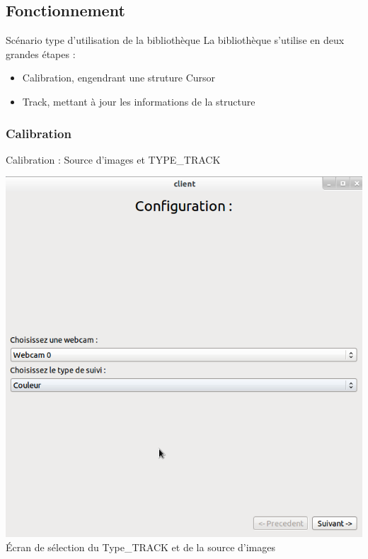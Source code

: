\documentclass{beamer}
\begin{document}
		\subsection{Fonctionnement}
		\begin{frame}{Scénario type d'utilisation de la bibliothèque}
			La bibliothèque s'utilise en deux grandes étapes :
			\begin{itemize}
				\item{Calibration, engendrant une struture Cursor}
				\item{Track, mettant à jour les informations de la structure}
			\end{itemize}
		\end{frame}

		\subsubsection{Calibration}
		\begin{frame}{Calibration : Source d'images et TYPE\_TRACK}
			\begin{center}
				\includegraphics[scale=0.25]{Capture6.png}\\
				Écran de sélection du Type\_TRACK et de la source d'images
			\end{center}
		\end{frame}
\end{document}

